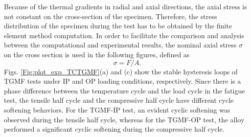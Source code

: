 \documentclass[preprint,5p,twocolumn,10pt,sort&compress]{elsarticle}
\begin{document}
Because of the thermal gradients in radial and axial directions, the axial stress is not constant on the cross-section of the specimen.
Therefore, the stress distribution of the specimen during the test has to be obtained by the finite element method computation.
In order to facilitate the comparison and analysis between the computational and experimental results, the nominal axial stress $\sigma$ on the cross section is used in the following figures, defined as
\begin{equation}
\sigma = F/A.
\end{equation}
Figs. \ref{Fig:plot_exp_TCTGMF}(a) and (c) show the stable hysteresis loops of TGMF tests under IP and OP loading conditions, respectively.
Since there is a phase difference between the temperature cycle and the load cycle in the fatigue test, the tensile half cycle and the compressive half cycle have different cycle softening behaviors.
For the TGMF-IP test, an evident cyclic softening was observed during the tensile half cycle, whereas for the TGMF-OP test, the alloy performed a significant cyclic softening during the compressive half cycle.
\end{document}
